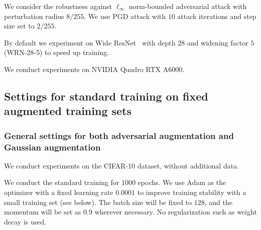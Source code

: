 We consider the robustness against $\ell_\infty$ norm-bounded adversarial attack with perturbation radius $8/255$. We use PGD attack with $10$ attack iterations and step size set to $2/255$.



By default we experiment on Wide ResNet~\citep{Zagoruyko2016WideRN} with depth $28$ and widening factor $5$ (WRN-28-5) to speed up training. 

We conduct experiments on 
NVIDIA Quadro RTX A6000.

  









\subsection{Settings for standard training on fixed augmented training sets}

\subsubsection{General settings for both adversarial augmentation and Gaussian augmentation}

We conduct experiments on the CIFAR-10 dataset, without additional data.

We conduct the standard training for $1000$ epochs.
We use Adam as the optimizer with a fixed learning rate $0.0001$ to improve training stability with a small training set (see below). The batch size will be fixed to $128$, and the momentum will be set as $0.9$ wherever necessary. No regularization such as weight decay is used.

